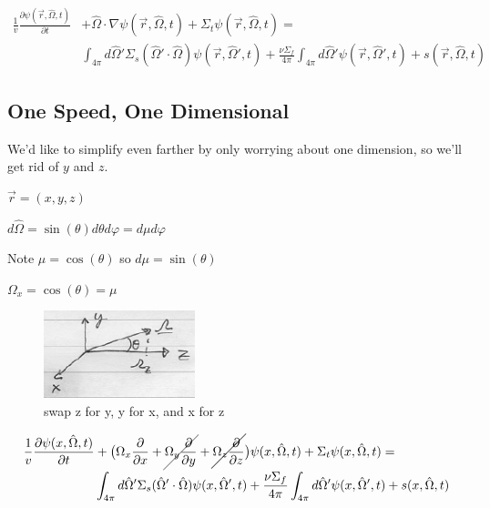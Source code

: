 \documentclass[12pt]{article}
\newcommand{\vOmega}{\ensuremath{\hat{\Omega}}}
\begin{document}
\begin{align*}
\frac{1}{v}\frac{\partial \psi(\vec{r}, \vOmega, t)}{\partial t} &+ 
\vOmega \cdot \nabla \psi(\vec{r}, \vOmega, t) +
\Sigma_t \psi(\vec{r}, \vOmega, t) = \nonumber\\
%
& \int_{4\pi} d\vOmega' \Sigma_s(\vOmega' \cdot \vOmega) \psi(\vec{r}, \vOmega', t)  
+ \frac{\nu \Sigma_f}{4\pi} \int_{4\pi} d\vOmega' \psi(\vec{r},  \vOmega', t) 
+ s(\vec{r}, \vOmega, t) 
\end{align*}
%


\subsection*{One Speed, One Dimensional}

We'd like to simplify even farther by only worrying about one dimension, so we'll get rid of $y$ and $z$.

\begin{minipage}{0.5\textwidth}
$\vec{r} = (x, y, z)$

$d\vOmega = \sin(\theta) d\theta	d\varphi = d\mu d\varphi$

Note $\mu = \cos(\theta)$ so $d\mu = \sin(\theta)$

$\Omega_x = \cos(\theta) = \mu$
\end{minipage} \hfill
\begin{minipage}{0.45\textwidth}
\begin{figure}[H]
\includegraphics[height=1in]{1Dspace}
\caption{swap z for y, y for x, and x for z}
\end{figure}
\end{minipage}

\begin{align*}
\frac{1}{v}\frac{\partial \psi(x, \vOmega, t)}{\partial t} &+ 
\bigl(\Omega_x \frac{\partial}{\partial x} + \cancel{\Omega_y \frac{\partial}{\partial y}} + \cancel{\Omega_z \frac{\partial}{\partial z}} \bigr)\psi(x, \vOmega, t) +
\Sigma_t \psi(x, \vOmega, t) = \nonumber\\
%
& \int_{4\pi} d\vOmega' \Sigma_s(\vOmega' \cdot \vOmega) \psi(x, \vOmega', t)  + 
\frac{\nu \Sigma_f}{4\pi} \int_{4\pi} d\vOmega' \psi(x,  \vOmega', t) + s(x, \vOmega, t)%
\end{align*}
\end{document}
